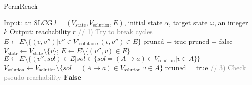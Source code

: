 
\begin{algorithm}
  \caption{PermReach}\label{alg:perm}
  \begin{algorithmic}[1]
   \State Input: an SLCG $l=(V_{\mathrm{state}},V_{\mathrm{solution}}, E)$, initial state $\alpha$, target state $\omega$, an integer $k$
\State Output: reachability $r$
\State \textcolor{gray}{// 1) Try to break cycles}%
                \State $E\gets E\setminus \{(v,v'')|v''\in V'_{\mathrm{solution}},(v,v'')\in E\}$
            \EndIf
        \EndFor
    \EndIf
\EndFor %
\State{\textcolor{gray}{// 2) Remove useless nodes/edges}} %
\State pruned = true
    \State pruned = false
            \State $V_{\mathrm{state}} \gets V_{\mathrm{state}}\setminus \{v\}$; $E\gets E\setminus \{ (v'',v)\in E\}$
            \State $E\gets E\setminus \{ (v'',sol)\in E | sol \in \{sol = (A \rightarrow a) \in V_{\mathrm{solution}} | v \in A\}\}$
            \State $V_{\mathrm{solution}} \gets V_{\mathrm{solution}}\setminus \{sol = (A \rightarrow a) \in V_{\mathrm{solution}} | v \in A\}$
            \State pruned = true
        \EndIf
    \EndFor %
\EndWhile
\State \textcolor{gray}{// 3) Check pseudo-reachability} %
    \State \Return $\mathbf{False}$
\EndIf %

  \end{algorithmic}
\end{algorithm}

